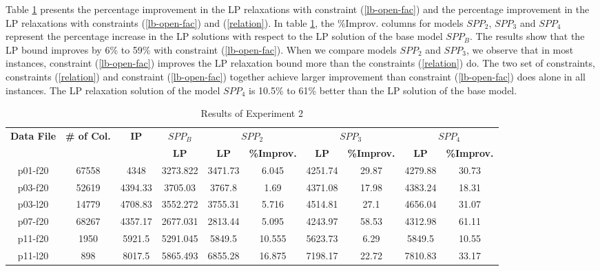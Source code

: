 Table \ref{lpbounds-gr2} presents the percentage improvement in the LP relaxations with
constraint (\ref{lb-open-fac}) and the percentage improvement in the LP relaxations with
constraints (\ref{lb-open-fac}) and (\ref{relation}). In table \ref{lpbounds-gr2}, the \%Improv. 
columns for models $SPP_2$, $SPP_3$ and $SPP_4$ represent the percentage increase
in the LP solutions with respect to the LP solution of the base model $SPP_B$. 
The results show that the LP bound improves by 6\% to 59\% with constraint 
(\ref{lb-open-fac}). When we compare models $SPP_2$ and $SPP_3$, we observe that
in most instances, constraint (\ref{lb-open-fac}) improves the LP relaxation bound 
more than the constraints (\ref{relation}) do. The two set of constraints, constraints (\ref{relation}) and
constraint (\ref{lb-open-fac}) together achieve larger improvement than 
constraint (\ref{lb-open-fac}) does alone in all instances. The LP relaxation
solution of the model $SPP_4$ is 10.5\% to 61\% better than the LP
solution of the base model. 

\begin{table}
\centering
\caption{Results of Experiment 2}\label{lpbounds-gr2}
\begin {tabular}[t]{|c|c|c|c|c|c|c|c|c|c|}  
\hline
{\bf Data File} & {\bf \# of Col.} & {\bf IP} & {\bf $SPP_B$}& \multicolumn{2}{|c|}{{\bf $SPP_2$}} & \multicolumn{2}{|c|}{{\bf $SPP_3$}} & \multicolumn{2}{|c|}{{\bf $SPP_4$}}\\ \cline {4-10}
\mbox{} &  \mbox{} &  \mbox{} &  {\bf LP} & {\bf LP} & {\bf \%Improv.} & {\bf LP} & {\bf \%Improv.} & {\bf LP} & {\bf \%Improv.} \\\hline
p01-f20	&	67558	&	4348	&	3273.822        & 3471.73	& 6.045  & 4251.74	&	29.87	&	4279.88	&	30.73	\\\hline
p03-f20	&	52619	&	4394.33	&	3705.03	        & 3767.8	& 1.69   &  4371.08	&	17.98	&	4383.24	&	18.31	\\\hline
p03-l20	&	14779	&	4708.83	&	3552.272	& 3755.31	& 5.716  & 4514.81	&	27.1	&	4656.04	&	31.07	\\\hline
p07-f20	&	68267	&	4357.17	&	2677.031	& 2813.44	& 5.095  & 4243.97	&	58.53	&	4312.98	&	61.11	\\\hline
p11-f20	&	1950	&	5921.5	&	5291.045	& 5849.5	& 10.555 & 5623.73	&	6.29	&	5849.5	&	10.55	\\\hline
p11-l20	&	898	&	8017.5	&	5865.493	& 6855.28	& 16.875 & 7198.17	&	22.72	&	7810.83	&	33.17	\\\hline
\end{tabular}
\end{table}

